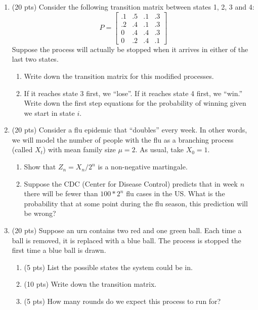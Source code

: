 \documentclass[12pt]{article}
\begin{document}
\begin{enumerate}
\item (20 pts) Consider the following transition matrix between states
  1, 2, 3 and 4:
\begin{displaymath}
P = \left[\begin{array}{cccc}
             .1 & .5 & .1 & .3 \\
             .2 & .4 & .1 & .3 \\
             0  & .4 & .4 & .3 \\
             0  & .2 & .4 & .1
         \end{array}
     \right]
\end{displaymath}
Suppose the process will actually be stopped when it arrives in either
of the last two states.  
\begin{enumerate}
\item Write down the transition matrix for this modified processes.
\item If it reaches state 3 first, we ``lose''.  If it reaches state 4
  first, we ``win.''  Write down the first step equations for the
  probability of winning given we start in state $i$.
\end{enumerate}
\item (20 pts) Consider a flu epidemic that ``doubles'' every week.
  In other words, we will model the number of people with the flu as a
  branching process (called $X_t$) with mean family size $\mu = 2$.
  As usual, take $X_0 = 1$.
\begin{enumerate}
\item Show that $Z_n = X_n/2^n$ is a non-negative martingale.  
\item Suppose the CDC (Center for Disease Control) predicts that in
  week $n$ there will be fewer than $100*2^n$ flu cases in the US.
  What is the probability that at some point during the flu season,
  this prediction will be wrong?  
\end{enumerate}
\newpage

\item (20 pts) Suppose an urn contains two red and one green ball.
Each time a ball is removed, it is replaced with a blue ball.  The
process is stopped the first time a blue ball is drawn.
\begin{enumerate}
\item (5 pts) List the possible states the system could be in.
\item (10 pts) Write down the transition matrix.
\item (5 pts) How many rounds do we expect this process to run for?
\end{enumerate}



\end{enumerate}
\end{document}
